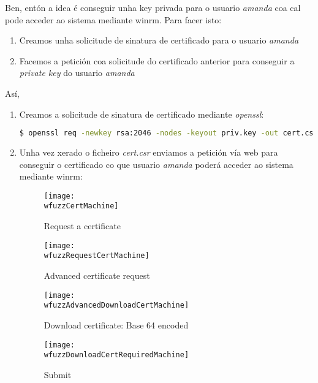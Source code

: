 \documentclass[a4paper]{article}
\newcommand{\wfuzzCertMachine}{wfuzz2_sizzle.png}
\newcommand{\wfuzzRequestCertMachine}{wfuzz4_sizzle.png}
\newcommand{\wfuzzAdvancedDownloadCertMachine}{wfuzz5_sizzle.png}
\newcommand{\wfuzzDownloadCertRequiredMachine}{wfuzz6_sizzle.png}
\begin{document}
        \vspace{0.2cm}

        Ben, entón a idea é conseguir unha key privada para o usuario \textit{amanda} coa cal pode acceder ao sistema mediante winrm. Para facer isto:
        \begin{enumerate}[label=(\arabic*)]
                \item Creamos unha solicitude de sinatura de certificado para o usuario \textit{amanda}
                \item Facemos a petición coa solicitude do certificado anterior para conseguir a \textit{private key} do usuario \textit{amanda}
        \end{enumerate}

        Así,
        \begin{enumerate}[label=(\arabic*)]
                \item Creamos a solicitude de sinatura de certificado mediante \textit{openssl}:
        \begin{lstlisting}[language=Bash, caption=openssl: cert.csr]
$ openssl req -newkey rsa:2046 -nodes -keyout priv.key -out cert.csr\end{lstlisting}

                \item Unha vez xerado o ficheiro \textit{cert.csr} enviamos a petición vía web para conseguir o certificado co que usuario \textit{amanda} poderá acceder ao sistema mediante winrm:
        \begin{figure}[h]
                \centering
                \texttt{[image: \\wfuzzCertMachine]}
                \caption{Request a certificate}
        \end{figure}
 
        \begin{figure}[h]
                \centering
                \texttt{[image: \\wfuzzRequestCertMachine]}
                \caption{Advanced certificate request}
        \end{figure}
        
        \begin{figure}[h]
                \centering
                \texttt{[image: \\wfuzzAdvancedDownloadCertMachine]}
                \caption{Download certificate: Base 64 encoded}
        \end{figure}
        
        \begin{figure}[h]
                \centering
                \texttt{[image: \\wfuzzDownloadCertRequiredMachine]}
                \caption{Submit}
        \end{figure}


        \end{enumerate}
\end{document}
